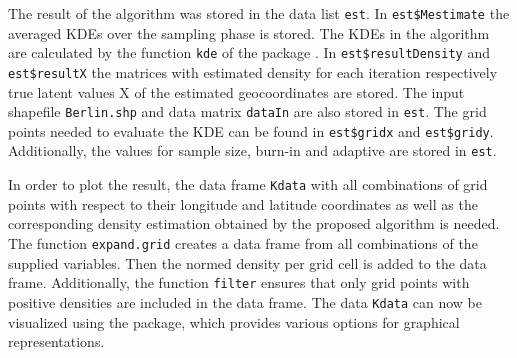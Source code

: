 The result of the algorithm was stored in the data list \texttt{est}. In \texttt{est\$Mestimate} the averaged KDEs over the sampling phase is stored. The KDEs in the algorithm are calculated by the function \texttt{kde} of the package \hyperlink{https://cran.r-project.org/web/packages/ks/index.html}{}. In \texttt{est\$resultDensity} and \texttt{est\$resultX} the matrices with estimated density for each iteration respectively true latent values X of the estimated geocoordinates are stored. 
The input shapefile \texttt{Berlin.shp} and data matrix \texttt{dataIn} are also stored in \texttt{est}. The grid points needed to evaluate the KDE can be found in \texttt{est\$gridx} and \texttt{est\$gridy}. Additionally, the values for sample size,  burn-in and adaptive are stored in \texttt{est}. 

In order to plot the result, the data frame \texttt{Kdata} with all combinations of grid points with respect to their longitude and latitude coordinates as well as the corresponding density estimation obtained by the proposed algorithm is needed. The function \texttt{expand.grid} creates a data frame from all combinations of the supplied variables.
Then the normed density per grid cell is added to the data frame. 
Additionally, the function \texttt{filter} ensures that only grid points with positive densities are included in the data frame.
The data \texttt{Kdata} can now be visualized using the \hyperlink{https://cran.r-project.org/web/packages/ggplot2/index.html}{} package, which provides various options for graphical representations.


